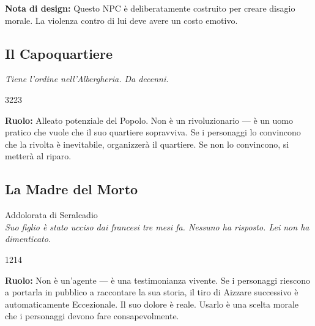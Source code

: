 \textbf{Nota di design:} Questo NPC è deliberatamente costruito
per creare disagio morale. La violenza contro di lui deve avere
un costo emotivo.

\filetto

\subsection{Il Capoquartiere}
\textit{Tiene l'ordine nell'Albergheria. Da decenni.}

%
{3}{2}{2}{3}

\textbf{Ruolo:} Alleato potenziale del Popolo. Non è un rivoluzionario —
è un uomo pratico che vuole che il suo quartiere sopravviva. Se i
personaggi lo convincono che la rivolta è inevitabile, organizzerà
il quartiere. Se non lo convincono, si metterà al riparo.

\subsection{La Madre del Morto}
{\cinzel\footnotesize\color{grigionote} Addolorata di Seralcadio}\\
\textit{Suo figlio è stato ucciso dai francesi tre mesi fa. Nessuno
ha risposto. Lei non ha dimenticato.}

%
{1}{2}{1}{4}

\textbf{Ruolo:} Non è un'agente — è una testimonianza vivente.
Se i personaggi riescono a portarla in pubblico a raccontare la
sua storia, il tiro di Aizzare successivo è automaticamente Eccezionale.
Il suo dolore è reale. Usarlo è una scelta morale che i personaggi
devono fare consapevolmente.

\filettodoppio
